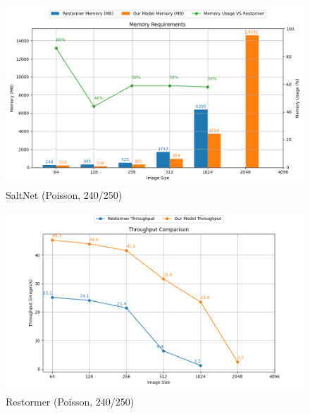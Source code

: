 \begin{figure}[!hbt]
        \centering
        \includegraphics[width=\textwidth]{assets/memory-requirements.png}
        \caption{SaltNet (Poisson, 240/250)}
\end{figure}
\begin{figure}[!hbt]
        \centering
        \includegraphics[width=\textwidth]{assets/throughput.png}
        \caption{Restormer (Poisson, 240/250)}
\end{figure}